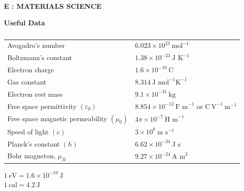 \documentclass[12pt]{article}
\begin{document}
\newpage

\begin{center}
    \textbf{\Large E : MATERIALS SCIENCE}
\end{center}

\textbf{Useful Data}

   \begin{table}[H]     \centering     \caption{}     \label{}     \begin{tabular}{ll}
Avogadro's number & $6.023 \times 10^{23} \ \text{mol}^{-1}$ \\
Boltzmann's constant & $1.38 \times 10^{-23} \ \text{J K}^{-1}$ \\
Electron charge & $1.6 \times 10^{-19} \ \text{C}$ \\
Gas constant & $8.314 \ \text{J mol}^{-1} \text{K}^{-1}$ \\
Electron rest mass & $9.1 \times 10^{-31} \ \text{kg}$ \\
Free space permittivity $(\varepsilon_0)$ & $8.854 \times 10^{-12} \ \text{F m}^{-1}$ or $\text{C} \ \text{V}^{-1} \ \text{m}^{-1}$ \\
Free space magnetic permeability $(\mu_0)$ & $4\pi \times 10^{-7} \ \text{H m}^{-1}$ \\
Speed of light $(c)$ & $3 \times 10^{8} \ \text{m s}^{-1}$ \\
Planck's constant $(h)$ & $6.62 \times 10^{-34} \ \text{J s}$ \\
Bohr magneton, $\mu_B$ & $9.27 \times 10^{-24} \ \text{A m}^2$ \\
\end{tabular} \end{table}


$1 \ \text{eV} = 1.6 \times 10^{-19} \ \text{J}$ \\
$1 \ \text{cal} = 4.2 \ \text{J}$
\end{document}
